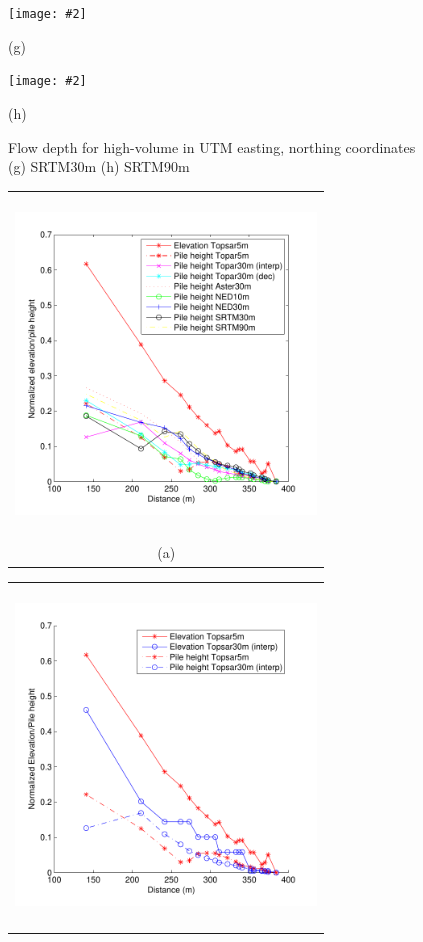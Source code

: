 \documentclass[12pt,letterpaper]{article}
\newcommand{\Pic}[2][0.85]{\begin{center}\texttt{[image: \#2]}
 \end{center} }
\begin{document}
\begin{figure}[H]
  \ContinuedFloat 
 \centering
  \Pic[0.9]{High_pics/srtm30.jpg} 
  (g) \Pic[0.9]{High_pics/srtm90.jpg}
  (h)
  \caption{Flow depth for high-volume in UTM easting, northing coordinates (g) SRTM30m (h) SRTM90m}
  \label{fig9}
\end{figure}


\begin{figure}[H]
  \begin{minipage}[b]{0.5\textwidth}
    \begin{tabular}{c}
      \includegraphics[width=8cm,height=9cm,keepaspectratio]{plots/low_all.pdf}\\
      (a)
    \end{tabular}
  \end{minipage}
  \begin{minipage}{0.5\textwidth}
    \begin{tabular}{c}
      \includegraphics[width=8cm,height=9cm,keepaspectratio]{plots/low_T5_T30.pdf}\\

\end{tabular}
\end{minipage}
\end{figure}
\end{document}
